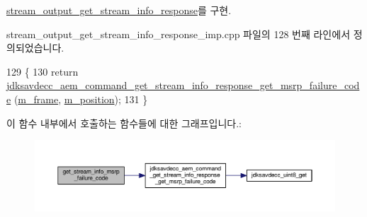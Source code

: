 \hyperlink{classavdecc__lib_1_1stream__output__get__stream__info__response_ac6de72a4fceb3b08ac797689cd04c213}{stream\+\_\+output\+\_\+get\+\_\+stream\+\_\+info\+\_\+response}를 구현.



stream\+\_\+output\+\_\+get\+\_\+stream\+\_\+info\+\_\+response\+\_\+imp.\+cpp 파일의 128 번째 라인에서 정의되었습니다.


\begin{DoxyCode}
129 \{
130     \textcolor{keywordflow}{return} \hyperlink{group__command__get__stream__info__response_gafe1f00653ff44ce4d64da0d4a93afb91}{jdksavdecc\_aem\_command\_get\_stream\_info\_response\_get\_msrp\_failure\_code}
      (\hyperlink{classavdecc__lib_1_1stream__output__get__stream__info__response__imp_a50417969cf438e7c8d698726bbbe2ff9}{m\_frame}, \hyperlink{classavdecc__lib_1_1stream__output__get__stream__info__response__imp_af5e691c4a8a0feb07f48440b321206cd}{m\_position});
131 \}
\end{DoxyCode}


이 함수 내부에서 호출하는 함수들에 대한 그래프입니다.\+:
\nopagebreak
\begin{figure}[H]
\begin{center}
\leavevmode
\includegraphics[width=350pt]{classavdecc__lib_1_1stream__output__get__stream__info__response__imp_ae1309302604fdeaf7482693e3787c4f7_cgraph}
\end{center}
\end{figure}


